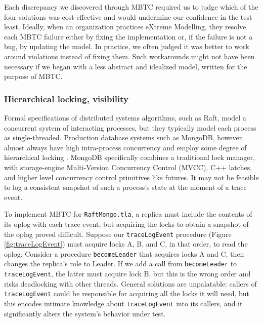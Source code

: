 \documentclass{vldb}
\begin{document}
Each discrepancy we discovered through MBTC required us to judge which of the four solutions was cost-effective and would undermine our confidence in the test least. 
Ideally, when an organization practices eXtreme Modelling, they resolve each MBTC failure either by fixing the implementation or, if the failure is not a bug, by updating the model.
In practice, we often judged it was better to work around violations instead of fixing them.
Such workarounds might not have been necessary if we began with a less abstract and idealized model, written for the purpose of MBTC.

\subsubsection{Hierarchical locking, visibility}
\label{subsubsec:mbtc_locking}

Formal specifications of distributed systems algorithms, such as Raft, model a concurrent system of interacting processes, but they typically model each process as single-threaded. 
Production database systems such as MongoDB, however, almost always have high intra-process concurrency and employ some degree of hierarchical locking \cite{Gray76SharedLocks}. 
MongoDB specifically combines a traditional lock manager, with storage-engine Multi-Version Concurrency Control (MVCC), C++ latches, and higher level concurrency control primitives like futures.
It may not be feasible to log a consistent snapshot of such a process's state at the moment of a trace event.


To implement MBTC for \texttt{RaftMongo.tla}, a replica must include the contents of its oplog with each trace event,
but acquiring the locks to obtain a snapshot of the oplog proved difficult. 
Suppose our \texttt{traceLogEvent} procedure (Figure \ref{fig:traceLogEvent}) must acquire locks A, B, and C, in that order, to read the oplog.
Consider a procedure \texttt{becomeLeader} that acquires locks A and C, then changes the replica's role to Leader. 
If we add a call from \texttt{becomeLeader} to \texttt{traceLogEvent}, the latter must acquire lock B, but this is the wrong order and risks deadlocking with other threads.
General solutions are unpalatable: callers of \texttt{traceLogEvent} could be responsible for acquiring all the locks it will need, but this encodes intimate knowledge about \texttt{traceLogEvent} into its callers, and it significantly alters the system's behavior under test.
\end{document}
